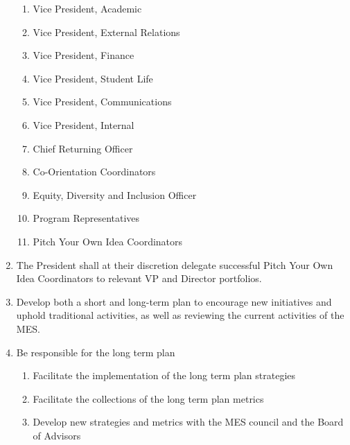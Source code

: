\begin{enumerate}
  \begin{enumerate}
   \item
    Vice President, Academic
   \item
    Vice President, External Relations
   \item
    Vice President, Finance
   \item
    Vice President, Student Life
   \item
    Vice President, Communications
   \item
    Vice President, Internal
   \item
    Chief Returning Officer
   \item
    Co-Orientation Coordinators
   \item
    Equity, Diversity and Inclusion Officer
   \item
    Program Representatives
    \item
    Pitch Your Own Idea Coordinators
  \end{enumerate}
 \item 
  The President shall at their discretion delegate successful Pitch Your Own Idea Coordinators to relevant VP and Director portfolios.
 \item
  Develop both a short and long-term plan to encourage new initiatives and uphold traditional activities, as well as reviewing the current activities of the MES.
 \item
  Be responsible for the long term plan

  \begin{enumerate}
   \item
    Facilitate the implementation of the long term plan strategies
   \item
    Facilitate the collections of the long term plan metrics
   \item
    Develop new strategies and metrics with the MES council and the Board of Advisors
  \end{enumerate}
\end{enumerate}